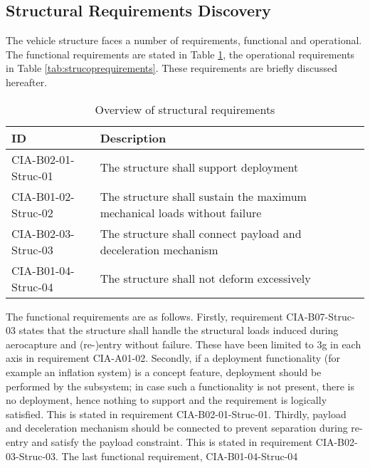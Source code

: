 \subsection{Structural Requirements Discovery} \label{sec:struct}
The vehicle structure faces a number of requirements, functional and operational. The functional requirements are stated in Table \ref{tab:strucfuncrequirements}, the operational requirements in Table \ref{tab:strucoprequirements}. These requirements are briefly discussed hereafter.
\begin{table}[H]
	\caption{Overview of structural requirements}
	\begin{tabular}{|p{}|p{}|}
    \hline
    ID          & Description                                                                                                      \\ \hline \hline
    CIA-B02-01-Struc-01 & The structure shall support deployment \\ \hline
    CIA-B01-02-Struc-02 & The structure shall sustain the maximum mechanical loads without failure                           \\ \hline
    CIA-B02-03-Struc-03 & The structure shall connect payload and deceleration mechanism \\ \hline
    CIA-B01-04-Struc-04 & The structure shall not deform excessively \\ \hline
    \end{tabular}
    \label{tab:strucfuncrequirements}
\end{table}
The functional requirements are as follows. Firstly, requirement CIA-B07-Struc-03 states that the structure shall handle the structural loads induced during aerocapture and (re-)entry without failure. These have been limited to 3g in each axis in requirement CIA-A01-02. Secondly, if a deployment functionality  (for example an inflation system) is a concept feature, deployment should be performed by the subsystem; in case such a functionality is not present, there is no deployment, hence nothing to support and the requirement is logically satisfied. This is stated in requirement CIA-B02-01-Struc-01. Thirdly, payload and deceleration mechanism should be connected to prevent separation during re-entry and satisfy the payload constraint. This is stated in requirement CIA-B02-03-Struc-03. The last functional requirement, CIA-B01-04-Struc-04

